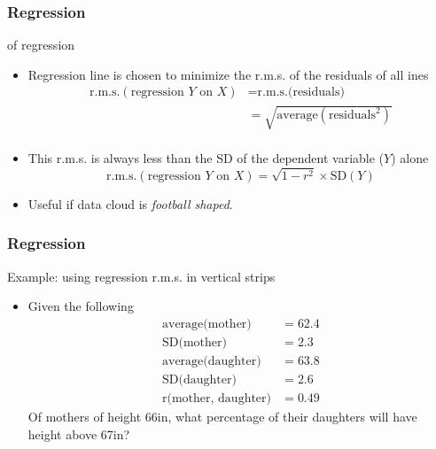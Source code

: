 \documentclass[handout]{beamer}
\begin{document}
   \begin{frame} \frametitle{Regression}

   \begin{block}
   { of regression}
   \begin{itemize}
   \item Regression line is chosen to minimize
   the r.m.s. of the residuals of all ines
   $$
   \begin{aligned}
   \text{r.m.s.}(\text{regression $Y$ on $X$}) &= \text{r.m.s.(residuals)} \\
   &= \sqrt{\text{average}(\text{residuals}^2)} \\
   \end{aligned}
   $$
   \item This r.m.s. is always less than the SD of
   the dependent variable ($Y$) alone
   $$
   \text{r.m.s.}(\text{regression $Y$ on $X$}) = \sqrt{1-r^2} \times \text{SD}(Y)
   $$
   \item Useful if data cloud is {\em football shaped}.
   \end{itemize}
   \end{block}
   \end{frame}


   \begin{frame} \frametitle{Regression}

   \begin{block}
   {Example: using regression r.m.s. in vertical strips}
   \begin{itemize}
   \item Given the following
     $$
     \begin{aligned}
       \text{average(mother)} &= 62.4\\
       \text{SD(mother)} &= 2.3 \\
       \text{average(daughter)} &= 63.8 \\
       \text{SD(daughter)} &= 2.6 \\
       \text{r(mother, daughter)} &= 0.49
     \end{aligned}
     $$
   Of mothers of height 66in, what percentage
   of their daughters will have height above 67in?

   \end{itemize}
   \end{block}
   \end{frame}

\end{document}
